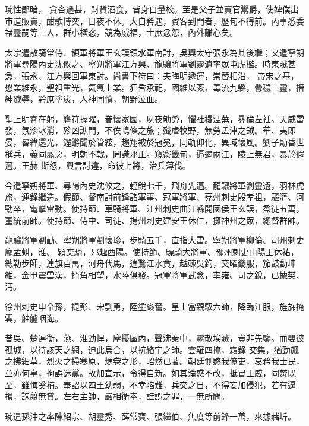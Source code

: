 \begin{pinyinscope}
 琬性鄙暗，
 貪吝過甚，財貨酒食，皆身自量校。至是父子並賣官鬻爵，使婢僕出市道販賣，酣歌博奕，日夜不休。大自矜遇，賓客到門者，歷旬不得前。內事悉委褚靈嗣等三人，群小橫恣，競為威福，士庶忿怨，內外離心矣。



 太宗遣散騎常侍、領軍將軍王玄謨領水軍南討，吳興太守張永為其後繼；又遣寧朔將軍尋陽內史沈攸之、寧朔將軍江方興、龍驤將軍劉靈遺率眾屯虎檻。時東賊甚急，張永、江方興回軍東討。尚書下符曰：夫晦明遞運，崇替相沿，
 帝宋之基，懋業維永，聖祖重光，氤氳上業。狂昏承祀，國維以紊，毒流九縣，釁穢三靈，搢紳戮辱，黔庶塗炭，人神同憤，朝野泣血。



 聖上明睿在躬，膺符握曜，眷懷家國，夙夜劬勞，懼社稷湮蕪，彞倫左衽。天威雷發，氛沴冰消，殄凶譙門，不俟鳴條之旅；殲虐牧野，無勞孟津之鉞。華、夷即晏，晷緯還光，鏗鏘聞於管絃，趨翔被於冠冕，同軌仰化，異域懷風。劉子勛昏世稱兵，義同翦惡，明朝不戟，罔識邪正。窺窬畿甸，逼遏兩江，陵上無君，暴於遐邇。王赫
 斯怒，興言討違，命彼上將，治兵薄伐。



 今遣寧朔將軍、尋陽內史沈攸之，輕銳七千，飛舟先邁。龍驤將軍劉靈遺，羽林虎旅，連鋒繼造。假節、督南討前鋒諸軍事、冠軍將軍、兗州刺史殷孝祖，驅濟、河勁卒，電擊雷動。使持節、車騎將軍、江州刺史曲江縣開國侯王玄謨，烝徒五萬，董統前師。使持節、侍中、司徒、揚州刺史建安王休仁，擁神州之眾，總督群帥。



 龍驤將軍劉勔、寧朔將軍劉懷珍，步騎五千，直指大雷。寧朔將軍柳倫、司州刺史龐孟虯，淮、
 潁突騎，邪趣西陽。使持節、驃騎大將軍、豫州刺史山陽王休祐，總勒步師，連旗百萬，河舟代馬，遄鶩江水賁，越棘吳鉤，交曜畿服，笳鼓動坤維，金甲震雲漢，掎角相望，水陸俱發。冠軍將軍武念，率雍、司之銳，已據樊、沔。



 徐州刺史申令孫，提彭、宋剽勇，陸塗焱奮。皇上當親馭六師，降臨江服，旌旆掩雲，舳艫咽海。



 昔吳、楚連衡，燕、淮勁悍，塵擾區內，聲沸秦中，霧散埃滅，豈非先鑒。而嬰彼孤城，以待該天之網，迫此烏合，以抗絡宇之師。雲羅四掩，霜鋒
 交集，猶勁飆之拂細草，烈火之掃寒原，燋卷之形，昭然已著。朝廷惻愍我僚吏，哀矜我士民，並亦何辜，拘誤迷黨。故加宣示，令得自新。如其淪惑不改，抵冒王威，同焚既至，雖悔奚補。奉詔以四王幼弱，不幸陷難，兵交之日，不得妄加侵犯，若有逼損，誅翦無貸。左右主帥，嚴相衛奉，詿誤之罪，一無所問。



 琬遣孫沖之率陳紹宗、胡靈秀、薛常寶、張繼伯、焦度等前鋒一萬，來據赭圻。




\end{pinyinscope}
